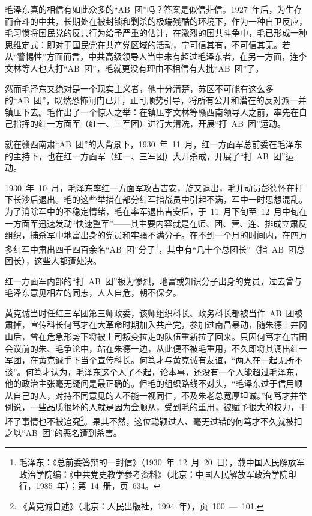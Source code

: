 毛泽东真的相信有如此众多的“AB~团”吗？答案是似信非信。1927~年后，为生存而奋斗的中共，长期处在被封锁和剿杀的极端残酷的环境下，作为一种自卫反应，毛习惯将国民党的反共行为给予严重的估计，在激烈的国共斗争中，毛已形成一种思维定式：即对于国民党在共产党区域的活动，宁可信其有，不可信其无。若从“警惕性”方面而言，中共高级领导人当中未有超过毛泽东者。在另一方面，连李文林等人也大打“AB~团”，毛就更没有理由不相信有大批“AB~团”了。

然而毛泽东又绝对是一个现实主义者，他十分清楚，苏区不可能有这么多的“AB~团”，既然恐怖闸门已开，正可顺势引导，将所有公开和潜在的反对派一并镇压下去。毛作出了一个惊人之举：在镇压李文林等赣西南领导人之前，率先在自己指挥的红一方面军（红一、三军团）进行大清洗，开展“打~AB~团”运动。

就在赣西南肃“AB~团”的大背景下，1930~年~11~月，红一方面军总前委在毛泽东的主持下，也在红一方面军（红一、三军团）大开杀戒，开展了“打~AB~团”运动。

1930~年~10~月，毛泽东率红一方面军攻占吉安，旋又退出，毛并动员彭德怀在打下长沙后退出。毛的这些举措在部分红军指战员中引起不满，军中一时思想混乱。为了消除军中的不稳定情绪，毛在率军退出吉安后，于~11~月下旬至~12~月中旬在一方面军迅速发动“快速整军”——其主要内容就是在师、团、营、连、排成立肃反组织，捕杀军中地富出身的党员和牢骚不满分子。在不到一个月的时间内，在四万多红军中肃出四千四百余名“AB~团”分子\footnote{毛泽东：《总前委答辩的一封信》（1930~年~12~月~20~日），载中国人民解放军政治学院编：《中共党史教学参考资料》（北京：中国人民解放军政治学院印行，1985~年）；第~14~册，页~634。}，其中有“几十个总团长”（指~AB~团总团长），这些人都遭处决。

红一方面军内部的“打~AB~团”极为惨烈，地富或知识分子出身的党员，过去曾与毛泽东意见相左的同志，人人自危，朝不保夕。

黄克诚当时任红三军团第三师政委，该师组织科长、政务科长都被当作~AB~团被肃掉，宣传科长何笃才在大革命时期加入共产党，参加过南昌暴动，随朱德上井冈山后，曾在危急形势下将被上司叛变拉走的队伍重新拉了回来。只因何笃才在古田会议前的朱、毛争论中，站在朱德一边，从此便不被毛重用，不久即将其调出红一军团，在黄克诚手下当个宣传科长。何笃才与黄克诚有友谊，“两人在一起无所不谈”。何笃才认为，毛泽东这个人了不起，论本事，还没有一个人能超过毛泽东，他的政治主张毫无疑问是最正确的。但毛的组织路线不对头，“毛泽东过于信用顺从自己的人，对持不同意见的人不能一视同仁，不及朱老总宽厚坦诚。”何笃才并举例说，一些品质很坏的人就是因为会顺从，受到毛的重用，被赋予很大的权力，干坏了事情也不被追究\footnote{《黄克诚自述》（北京：人民出版社，1994~年），页~100~—~101.}。果其不然，这位聪颖过人、毫无过错的何笃才不久就被扣之以“AB~团”的恶名遭到杀害。

